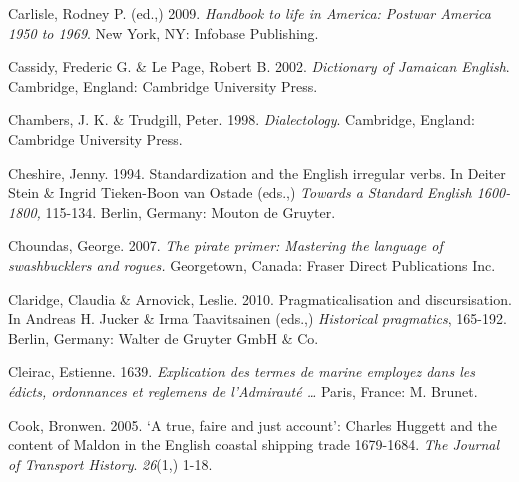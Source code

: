 \begin{styleStandard}
Carlisle, Rodney P. (ed.,) 2009. \textit{Handbook to life in America: Postwar America 1950 to 1969}. New York, NY: Infobase Publishing. 
\end{styleStandard}


\begin{styleStandard}
Cassidy, Frederic G. \& Le Page, Robert B. 2002. \textit{Dictionary of Jamaican English}. Cambridge, England: Cambridge University Press.
\end{styleStandard}


\begin{styleStandard}
Chambers, J. K. \& Trudgill, Peter. 1998. \textit{Dialectology}. Cambridge, England: Cambridge University Press. 
\end{styleStandard}


\begin{styleStandard}
Cheshire, Jenny. 1994. Standardization and the English irregular verbs. In Deiter Stein \& Ingrid Tieken-Boon van Ostade (eds.,) \textit{Towards a Standard English 1600-1800, }115-134.\textit{ }Berlin, Germany: Mouton de Gruyter. 
\end{styleStandard}


\begin{styleStandard}
Choundas, George. 2007. \textit{The pirate primer: Mastering the language of swashbucklers and} \textit{rogues.} Georgetown, Canada: Fraser Direct Publications Inc.
\end{styleStandard}


\begin{styleStandard}
Claridge, Claudia \& Arnovick, Leslie. 2010. Pragmaticalisation and discursisation. In Andreas H. Jucker \& Irma Taavitsainen (eds.,) \textit{Historical pragmatics}, 165-192. Berlin, Germany: Walter de Gruyter GmbH \& Co.
\end{styleStandard}


\begin{styleStandard}
Cleirac, Estienne. 1639. \textit{Explication des termes de marine employez dans les édicts, ordonnances et reglemens de l’Admirauté …} Paris, France: M. Brunet. 
\end{styleStandard}


\begin{styleStandard}
Cook, Bronwen. 2005. ‘A true, faire and just account’: Charles Huggett and the content of Maldon in the English coastal shipping trade 1679-1684. \textit{The Journal of Transport History}. \textit{26}(1,) 1-18.
\end{styleStandard}


